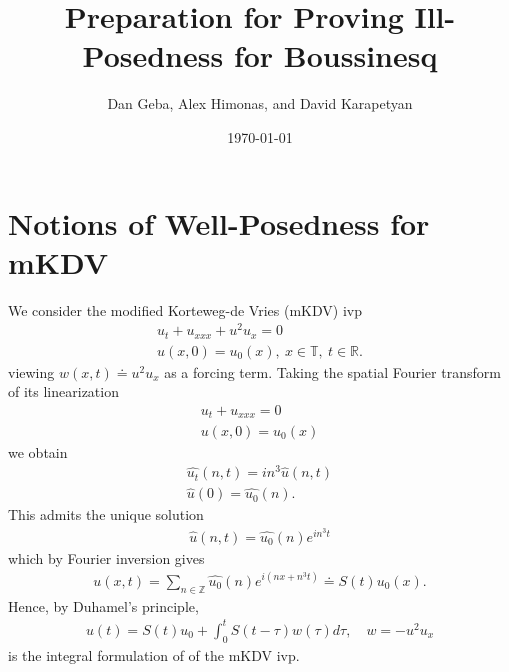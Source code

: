 \documentclass[12pt,reqno]{amsart}
\numberwithin{equation}{section}  %
\newcommand{\rr}{\mathbb{R}}
\newcommand{\zz}{\mathbb{Z}}
\newcommand{\ci}{\mathbb{T}}
\newcommand{\wh}{\widehat}
\begin{document}
\title{Preparation for Proving Ill-Posedness for Boussinesq}
\author{Dan Geba, Alex Himonas, and David Karapetyan}
\address{Department of Mathematics  \\
    University  of Notre Dame\\
        Notre Dame, IN 46556 }
        \date{\today}
        \maketitle
        \tableofcontents
\section{Notions of Well-Posedness for mKDV}
        We consider the modified 
        Korteweg-de Vries (mKDV) ivp
        \begin{gather}
          \label{mkdv}
          u_{t} + u_{xxx} + u^{2} u_{x} = 0
          \\
          u(x,0) = u_{0}(x), \ x \in \ci, \ t \in \rr.
          \label{mkdv-init}
        \end{gather}
        viewing $w(x,t) \doteq u^{2} u_{x}$ as a forcing term.
        Taking the spatial Fourier transform of its linearization
        \begin{gather*}
          \label{lin-mkdv}
          u_{t} + u_{xxx} =0
          \\
          u(x,0) = u_{0}(x)
          \label{lin-mkdv-init}
        \end{gather*}
 we obtain
 \begin{equation*}
 \begin{split}
   \wh{u_{t}}(n, t) =  i n^{3}\wh{u}(n,t) 
   \\
   \wh{u}(0) = \wh{u_{0}}(n).
 \end{split}
 \end{equation*}
 This admits the unique solution
 \begin{equation*}
 \begin{split}
   \wh{u}(n,t) = \wh{u_{0}}(n) e^{i n^{3}t}
 \end{split}
 \end{equation*}
 which by Fourier inversion gives
 \begin{equation*}
 \begin{split}
   u(x,t) = \sum_{n \in \zz} \wh{u_{0}}(n) e^{i\left( nx + n^{3}t \right)} \doteq S(t)u_{0}(x).  \end{split}
 \end{equation*}
Hence, by Duhamel's principle, 
%
%
\begin{equation}
  \label{int-reform-mkdv}
\begin{split}
  u(t) = S(t)u_{0} + \int_{0}^{t} S(t- \tau) w(\tau) d \tau, \quad w =
  -u^{2}u_{x}
\end{split}
\end{equation}
%
%
is the integral formulation of of the mKDV ivp. 
\end{document}

